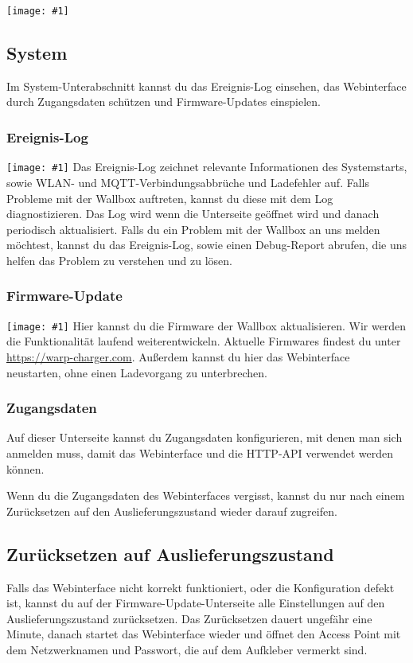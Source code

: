 \documentclass[a4paper,10pt]{article}
\newcommand{\hint}[1]{\begin{tcolorbox}[colback=boxgray,colframe=black,coltext=
white,title=Hinweis]#1\end{tcolorbox}}
\newcommand{\gfx}[1]{\texttt{[image: \#1]}}
\begin{document}
\begin{multicols*}{2}
	\gfx{./img_warp2/resized/web_meter}

	\subsection{System}
	Im System-Unterabschnitt kannst du das Ereignis-Log einsehen, das Webinterface durch Zugangsdaten schützen und Firmware-Updates einspielen.
	\subsubsection{Ereignis-Log}
	\gfx{./img_warp2/resized/web_event_log}
	Das Ereignis-Log zeichnet relevante Informationen des Systemstarts, sowie WLAN- und MQTT-Verbindungsabbrüche und Ladefehler auf.
	Falls Probleme mit der Wallbox auftreten, kannst du diese mit dem Log diagnostizieren.
	Das Log wird wenn die Unterseite geöffnet wird und danach periodisch aktualisiert.
	Falls du ein Problem mit der Wallbox an uns melden möchtest, kannst du das Ereignis-Log,
	sowie einen Debug-Report abrufen, die uns helfen das Problem zu verstehen und zu lösen.

	\subsubsection{Firmware-Update}
	\gfx{./img_warp2/resized/web_firmware_update}
	Hier kannst du die Firmware der Wallbox aktualisieren. Wir werden die Funktionalität
	laufend weiterentwickeln. Aktuelle Firmwares findest du unter \url{https://warp-charger.com}.
	Außerdem kannst du hier das Webinterface neustarten, ohne einen Ladevorgang zu unterbrechen.

	\subsubsection{Zugangsdaten}
	Auf dieser Unterseite kannst du Zugangsdaten konfigurieren, mit denen man sich anmelden muss,
	damit das Webinterface und die HTTP-API verwendet werden können.

	\hint{Wenn du die Zugangsdaten des Webinterfaces vergisst, kannst du nur nach einem Zurücksetzen
	auf den Auslieferungszustand wieder darauf zugreifen.}

	\vfill
	\subsection{Zurücksetzen auf Auslieferungszustand}\label{reset}
	Falls das Webinterface nicht korrekt funktioniert, oder die Konfiguration defekt ist,
	kannst du auf der Firmware-Update-Unterseite alle Einstellungen auf den Auslieferungszustand zurücksetzen.
	Das Zurücksetzen dauert ungefähr eine Minute, danach startet das Webinterface wieder und öffnet
	den Access Point mit dem Netzwerknamen und Passwort, die auf dem Aufkleber vermerkt sind.


\end{multicols*}
\end{document}

